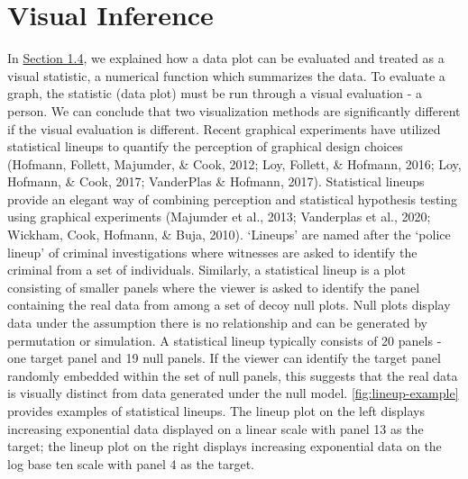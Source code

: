 \documentclass[print]{nuthesis}
\begin{document}
\hypertarget{visual-inference}{%
\section{Visual Inference}\label{visual-inference}}

In \protect\hyperlink{testing-statistical-graphics}{Section 1.4}, we explained how a data plot can be evaluated and treated as a visual statistic, a numerical function which summarizes the data.
To evaluate a graph, the statistic (data plot) must be run through a visual evaluation - a person.
We can conclude that two visualization methods are significantly different if the visual evaluation is different.
Recent graphical experiments have utilized statistical lineups to quantify the perception of graphical design choices (Hofmann, Follett, Majumder, \& Cook, 2012; Loy, Follett, \& Hofmann, 2016; Loy, Hofmann, \& Cook, 2017; VanderPlas \& Hofmann, 2017).
Statistical lineups provide an elegant way of combining perception and statistical hypothesis testing using graphical experiments (Majumder et al., 2013; Vanderplas et al., 2020; Wickham, Cook, Hofmann, \& Buja, 2010).
`Lineups' are named after the `police lineup' of criminal investigations where witnesses are asked to identify the criminal from a set of individuals.
Similarly, a statistical lineup is a plot consisting of smaller panels where the viewer is asked to identify the panel containing the real data from among a set of decoy null plots.
Null plots display data under the assumption there is no relationship and can be generated by permutation or simulation.
A statistical lineup typically consists of 20 panels - one target panel and 19 null panels.
If the viewer can identify the target panel randomly embedded within the set of null panels, this suggests that the real data is visually distinct from data generated under the null model.
\cref{fig:lineup-example} provides examples of statistical lineups.
The lineup plot on the left displays increasing exponential data displayed on a linear scale with panel 13 as the target; the lineup plot on the right displays increasing exponential data on the log base ten scale with panel 4 as the target.
\end{document}

